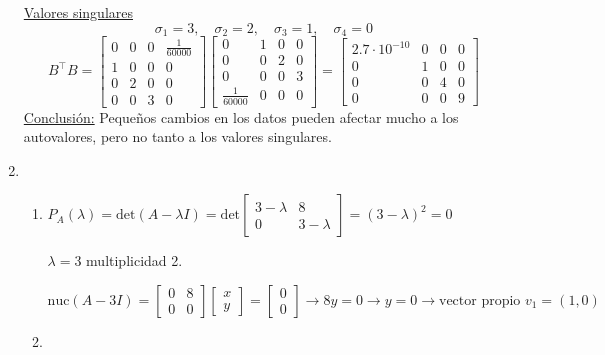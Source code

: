\begin{enumerate}[label=\color{red}\textbf{\arabic*)}]
\underline{Valores singulares} \[
\sigma_1=3,\quad\sigma_2=2,\quad\sigma_3=1,\quad\sigma_4=0
\]  
\[
B^\intercal B=\begin{bmatrix} 
    0 & 0 & 0 & \frac{1}{60000}\\
    1 & 0 & 0 & 0\\
    0 & 2 & 0 & 0\\
    0 & 0 & 3 & 0
\end{bmatrix}\begin{bmatrix} 
    0 & 1 & 0 & 0\\ 
    0 & 0 & 2 & 0\\
    0 & 0 & 0 & 3\\
    \frac{1}{60000} & 0 & 0 & 0 
\end{bmatrix}=\begin{bmatrix} 
    2.7\cdot 10^{-10} & 0 & 0 & 0\\
    0 & 1 & 0 & 0\\
    0 & 0 & 4 & 0\\
    0 & 0 & 0 & 9
\end{bmatrix} 
\] 
\underline{Conclusión:} Pequeños cambios en los datos pueden afectar mucho a los autovalores, pero no tanto a los valores singulares. 
\item {} 
\begin{enumerate}[label=\color{red}\textbf{\alph*)}]
    \item {}

        $P_A(\lambda)=\mathrm{det}(A-\lambda I)=\mathrm{det}\begin{bmatrix} 
            3-\lambda & 8\\
            0 & 3-\lambda
        \end{bmatrix}=(3-\lambda)^2=0 $

        $\lambda=3$ multiplicidad 2.

        $\mathrm{nuc}(A-3I)=\begin{bmatrix} 
            0 & 8\\
            0 & 0
        \end{bmatrix}\begin{bmatrix} 
        x\\y 
        \end{bmatrix}=\begin{bmatrix} 
        0\\0 
        \end{bmatrix}\longrightarrow 8y=0\longrightarrow y=0\longrightarrow \text{vector propio }v_1=(1,0) $
    \item {}


\end{enumerate}
\end{enumerate}
